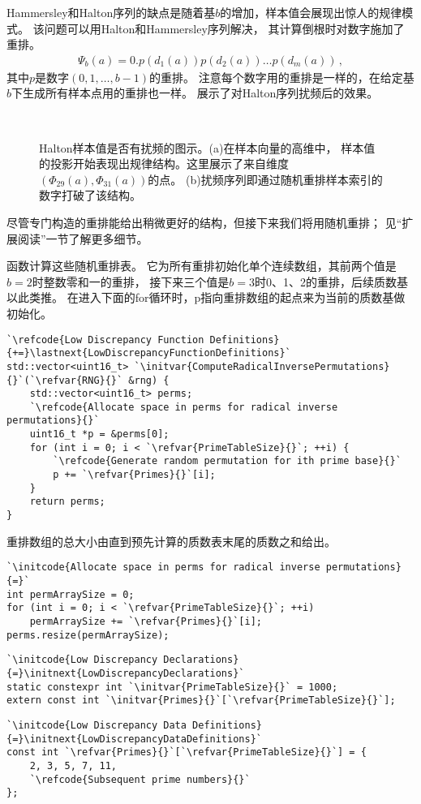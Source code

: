 Hammersley和Halton序列的缺点是随着基$b$的增加，样本值会展现出惊人的规律模式。
该问题可以用Halton和Hammersley序列解决，
其计算倒根时对数字施加了重排。
\begin{align}
    \label{eq:7.8}
    \Psi_b(a)=0.p(d_1(a))p(d_2(a))\ldots p(d_m(a))\, ,
\end{align}
其中$p$是数字$(0,1,\ldots,b-1)$的重排。
注意每个数字用的重排是一样的，在给定基$b$下生成所有样本点用的重排也一样。
展示了对Halton序列扰频后的效果。
\begin{figure}[htbp]
    \centering
    \,
    \caption{Halton样本值是否有扰频的图示。(a)在样本向量的高维中，
        样本值的投影开始表现出规律结构。这里展示了来自维度$(\Phi_{29}(a),\Phi_{31}(a))$的点。
        (b)扰频序列即通过随机重排样本索引的数字打破了该结构。}
    \label{fig:7.26}
\end{figure}

尽管专门构造的重排能给出稍微更好的结构，但接下来我们将用随机重排；
见“扩展阅读”一节了解更多细节。

函数计算这些随机重排表。
它为所有重排初始化单个连续数组，其前两个值是$b=2$时整数零和一的重排，
接下来三个值是$b=3$时0、1、2的重排，后续质数基以此类推。
在进入下面的{\ttfamily for}循环时，{\ttfamily p}指向重排数组的起点来为当前的质数基做初始化。
\begin{lstlisting}
`\refcode{Low Discrepancy Function Definitions}{+=}\lastnext{LowDiscrepancyFunctionDefinitions}`
std::vector<uint16_t> `\initvar{ComputeRadicalInversePermutations}{}`(`\refvar{RNG}{}` &rng) {
    std::vector<uint16_t> perms;
    `\refcode{Allocate space in perms for radical inverse permutations}{}`
    uint16_t *p = &perms[0];
    for (int i = 0; i < `\refvar{PrimeTableSize}{}`; ++i) {
        `\refcode{Generate random permutation for ith prime base}{}`
        p += `\refvar{Primes}{}`[i];
    }
    return perms;
}
\end{lstlisting}

重排数组的总大小由直到预先计算的质数表末尾的质数之和给出。
\begin{lstlisting}
`\initcode{Allocate space in perms for radical inverse permutations}{=}`
int permArraySize = 0;
for (int i = 0; i < `\refvar{PrimeTableSize}{}`; ++i)
    permArraySize += `\refvar{Primes}{}`[i];
perms.resize(permArraySize);
\end{lstlisting}
\begin{lstlisting}
`\initcode{Low Discrepancy Declarations}{=}\initnext{LowDiscrepancyDeclarations}`
static constexpr int `\initvar{PrimeTableSize}{}` = 1000;
extern const int `\initvar{Primes}{}`[`\refvar{PrimeTableSize}{}`];
\end{lstlisting}
\begin{lstlisting}
`\initcode{Low Discrepancy Data Definitions}{=}\initnext{LowDiscrepancyDataDefinitions}`
const int `\refvar{Primes}{}`[`\refvar{PrimeTableSize}{}`] = {
    2, 3, 5, 7, 11,
    `\refcode{Subsequent prime numbers}{}`
};
\end{lstlisting}

